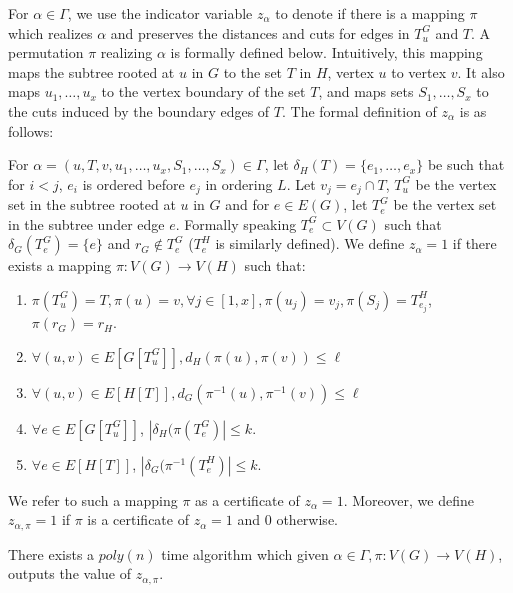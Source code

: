 For $\alpha \in \Gamma$, we use the indicator variable $z_{\alpha}$ to
denote
if there is a mapping $\pi$ which realizes $\alpha$ and preserves the
distances and cuts for edges in $T_u^G$ and $T$. A permutation $\pi$ realizing $\alpha$ is formally defined below. Intuitively, this
mapping maps the subtree rooted at $u$ in $G$ to the set $T$ in $H$,
vertex $u$ to vertex $v$. It also maps $u_1,\dots,u_x$ to the vertex
boundary of the set $T$, and maps sets $S_1,\dots,S_x$ to the cuts
induced by the boundary edges of $T$. The formal definition of
$z_\alpha$ is as follows:
%
\begin{definition}
  \label{def:z_alpha}
  For $\alpha=(u,T,v,u_1,\dots,u_x,S_1,\dots,S_x)\in \Gamma$, let
  $\delta_H(T) = \{e_1,\dots,e_x\}$ be such that for $i<j$, $e_i$ is
  ordered before $e_j$ in ordering $L$. Let $v_j = e_j \cap T$,
  $T_u^G$ be the vertex set in the subtree rooted at $u$ in $G$ and
  for $e \in E(G)$, let $T_e^G$ be the vertex set in the subtree under
  edge $e$. Formally speaking $T_e^G \subset V(G)$ such that
  $\delta_G(T_e^G)= \{e\}$ and $r_G \not \in T_e^G$ ($T_e^H$ is similarly
  defined). We define $z_\alpha= 1$ if there exists a mapping
  $\pi:V(G) \rightarrow V(H)$ such that:
  \begin{enumerate}
  \item \label{item:def-z-alpha-1}
    $\pi(T_u^G) = T, \pi(u) = v, \forall j \in [1,x], \pi(u_j) = v_j,
    \pi(S_j) = T_{e_j}^H$, $\pi(r_G) = r_H$.
  \item \label{item:def-z-alpha-2}
    $\forall (u,v) \in E[G[T_u^G]], d_H(\pi(u),\pi(v)) \leq \ell$
  \item \label{item:def-z-alpha-3}
    $\forall (u,v) \in E[H[T]], d_G(\pi^{-1}(u),\pi^{-1}(v)) \leq
    \ell$
  \item \label{item:def-z-alpha-4}
    $\forall e \in E[G[T_u^G]]$, $|\delta_H(\pi(T_e^G)| \leq k$.
  \item \label{item:def-z-alpha-5}
    $\forall e \in E[H[T]]$, $|\delta_G(\pi^{-1}(T_e^H)| \leq k$.
  \end{enumerate}
  We refer to such a mapping $\pi$ as a certificate of $z_\alpha =
  1$. Moreover, we define $z_{\alpha,\pi} = 1$ if $\pi$ is a
  certificate of $z_{\alpha} = 1$ and $0$ otherwise.
\end{definition}

\begin{claim}\label{prop:z_alpha_pi}
  There exists a $poly(n)$ time algorithm which given
  $\alpha \in \Gamma, \pi:V(G) \rightarrow V(H)$, outputs the value of
  $z_{\alpha,\pi}$.
\end{claim}

